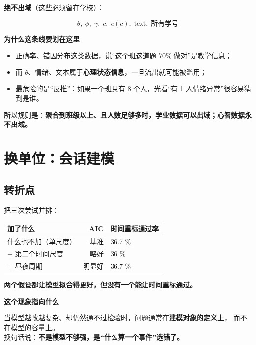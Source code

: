 \documentclass[UTF8,a4paper,11pt]{ctexart}
\newenvironment{explainbox}[1]
{\begin{center}\begin{minipage}{0.94\textwidth}\colorbox{boxbg}{\parbox{0.92\textwidth}{\textbf{#1}\par\vspace{2pt}}}}
{\end{minipage}\end{center}}
\newcommand{\hl}[1]{\textcolor{blue!70!black}{\textbf{#1}}}
\begin{document}
\textbf{绝不出域}（这些必须留在学校）：

\begin{equation}
\theta,\; \phi,\; \gamma,\; c,\; e(c),\; \text{text},\; \text{所有学号}
\end{equation}

\begin{explainbox}{为什么这条线要划在这里}
\begin{itemize}[leftmargin=1.4em,itemsep=1pt]
\item 正确率、错因分布这类数据，说“这个班这道题 70\% 做对”是教学信息；
\item 而 $\theta$、情绪、文本属于\textbf{心理状态信息}，一旦流出就可能被滥用；
\item 最危险的是“反推”：如果一个班只有 8 个人，光看“有 1 人情绪异常”很容易猜到是谁。
\end{itemize}
所以规则是：\hl{聚合到班级以上、且人数足够多时，学业数据可以出域；心智数据永不出域。}
\end{explainbox}

\newpage


\section{换单位：会话建模}

\subsection{转折点}

把三次尝试并排：

\begin{center}
\begin{tabular}{p{6.0cm}rp{4.6cm}}
\toprule
\textbf{加了什么} & \textbf{AIC} & \textbf{时间重标通过率} \\
\midrule
什么也不加（单尺度） & 基准 & 36.7 \% \\
+ 第二个时间尺度 & 略好 & 36 \% \\
+ 昼夜周期 & 明显好 & 36.7 \% \\
\bottomrule
\end{tabular}
\end{center}

\textbf{两个假设都让模型拟合得更好，但没有一个能让时间重标通过。}

\begin{explainbox}{这个现象指向什么}
当模型越改越复杂、却仍然通不过检验时，问题通常在\hl{建模对象的定义}上，
而不在模型的容量上。\\[4pt]
换句话说：\textbf{不是模型不够强，是“什么算一个事件”选错了。}
\end{explainbox}
\end{document}
